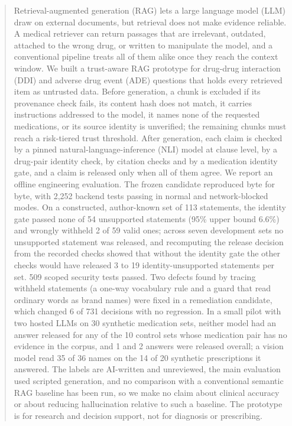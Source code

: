 \documentclass[conference]{IEEEtran}
\begin{document}
\begin{abstract}
Retrieval-augmented generation (RAG) lets a large language model (LLM) draw on external documents, but retrieval does not
make evidence reliable. A medical retriever can return passages that are irrelevant, outdated, attached to the wrong
drug, or written to manipulate the model, and a conventional pipeline treats all of them alike once they reach the
context window. We built a trust-aware RAG prototype for drug-drug interaction (DDI) and adverse drug event (ADE)
questions that holds every retrieved item as untrusted data. Before generation, a chunk is excluded if its provenance
check fails, its content hash does not match, it carries instructions addressed to the model, it names none of the
requested medications, or its source identity is unverified; the remaining chunks must reach a risk-tiered trust
threshold. After generation, each claim is checked by a pinned natural-language-inference (NLI) model at clause level,
by a drug-pair identity check, by citation checks and by a medication identity gate, and a claim is released only when
all of them agree. We report an offline engineering evaluation. The frozen candidate reproduced byte for byte, with
2{,}252 backend tests passing in normal and network-blocked modes. On a constructed, author-known set of 113 statements,
the identity gate passed none of 54 unsupported statements (95\% upper bound 6.6\%) and wrongly withheld 2 of 59 valid
ones; across seven development sets no unsupported statement was released, and recomputing the release decision from
the recorded checks showed that without the identity gate the other checks would have released 3 to 19
identity-unsupported statements per set. 509 scoped security tests passed. Two
defects found by tracing withheld statements (a one-way vocabulary rule and a guard that read ordinary words as brand
names) were fixed in a remediation candidate, which changed 6 of 731 decisions with no regression. In a small pilot with
two hosted LLMs on 30 synthetic medication sets, neither model had an answer released for any of the 10 control
sets whose medication pair has no evidence in the corpus, and 1 and 2 answers were released overall; a vision model read 35 of 36 names on the 14 of 20 synthetic
prescriptions it answered. The labels are AI-written and unreviewed, the main evaluation used scripted generation,
and no comparison with a conventional semantic RAG baseline has been run, so we make no claim about clinical accuracy or about reducing hallucination relative to such a
baseline. The prototype is for research and decision support, not for diagnosis or prescribing.
\end{abstract}
\end{document}
